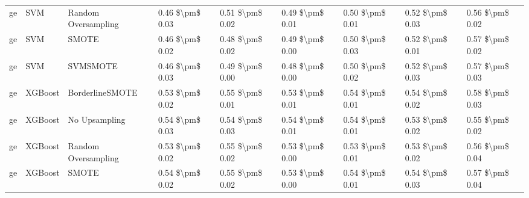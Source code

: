 \begin{tabular}{lllllllll}
      ge &                             SVM &           Random Oversampling & 0.46 \$\textbackslash pm\$ 0.03 &           0.51 \$\textbackslash pm\$ 0.02 &       0.49 \$\textbackslash pm\$ 0.01 &        0.50 \$\textbackslash pm\$ 0.01 &                         0.52 \$\textbackslash pm\$ 0.03 &     0.56 \$\textbackslash pm\$ 0.02 \\
      ge &                             SVM &                         SMOTE & 0.46 \$\textbackslash pm\$ 0.02 &           0.48 \$\textbackslash pm\$ 0.02 &       0.49 \$\textbackslash pm\$ 0.00 &        0.50 \$\textbackslash pm\$ 0.03 &                         0.52 \$\textbackslash pm\$ 0.01 &     0.57 \$\textbackslash pm\$ 0.02 \\
      ge &                             SVM &                      SVMSMOTE & 0.46 \$\textbackslash pm\$ 0.03 &           0.49 \$\textbackslash pm\$ 0.00 &       0.48 \$\textbackslash pm\$ 0.00 &        0.50 \$\textbackslash pm\$ 0.02 &                         0.52 \$\textbackslash pm\$ 0.03 &     0.57 \$\textbackslash pm\$ 0.03 \\
      ge &                         XGBoost &               BorderlineSMOTE & 0.53 \$\textbackslash pm\$ 0.02 &           0.55 \$\textbackslash pm\$ 0.01 &       0.53 \$\textbackslash pm\$ 0.01 &        0.54 \$\textbackslash pm\$ 0.01 &                         0.54 \$\textbackslash pm\$ 0.02 &     0.58 \$\textbackslash pm\$ 0.03 \\
      ge &                         XGBoost &                 No Upsampling & 0.54 \$\textbackslash pm\$ 0.03 &           0.54 \$\textbackslash pm\$ 0.03 &       0.54 \$\textbackslash pm\$ 0.01 &        0.54 \$\textbackslash pm\$ 0.01 &                         0.53 \$\textbackslash pm\$ 0.02 &     0.55 \$\textbackslash pm\$ 0.02 \\
      ge &                         XGBoost &           Random Oversampling & 0.53 \$\textbackslash pm\$ 0.02 &           0.55 \$\textbackslash pm\$ 0.02 &       0.53 \$\textbackslash pm\$ 0.00 &        0.53 \$\textbackslash pm\$ 0.01 &                         0.53 \$\textbackslash pm\$ 0.02 &     0.56 \$\textbackslash pm\$ 0.04 \\
      ge &                         XGBoost &                         SMOTE & 0.54 \$\textbackslash pm\$ 0.02 &           0.55 \$\textbackslash pm\$ 0.02 &       0.53 \$\textbackslash pm\$ 0.00 &        0.54 \$\textbackslash pm\$ 0.01 &                         0.54 \$\textbackslash pm\$ 0.03 &     0.57 \$\textbackslash pm\$ 0.04 \\

\end{tabular}
